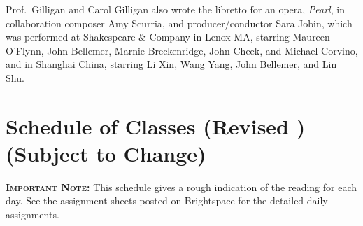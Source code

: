 \documentclass[11pt]{jgsyllabus}\usepackage[]{graphicx}\usepackage[]{xcolor}
\begin{document}
Prof.\ Gilligan and Carol Gilligan also wrote the libretto for an opera,
\emph{Pearl}, in collaboration composer Amy Scurria, and producer/conductor
Sara Jobin, which was performed at Shakespeare \& Company in Lenox MA,
starring Maureen O'Flynn, John Bellemer, Marnie Breckenridge, John Cheek, %
and Michael Corvino, and in Shanghai China,
starring Li Xin, Wang Yang, John Bellemer, and Lin Shu.
\fi
%
%
%
%
%
%

\clearpage
\appendix
\setcounter{secnumdepth}{0}
\newcommand{\maybehline}{\hline}%
\setlength\extrarowheight{4pt}
\section[Class Schedule]{Schedule of Classes
\ifrevised
	(Revised \RevisionDate)%
\else
	(Subject to Change)%
\fi}

\textbf{\scshape Important Note:} This schedule gives a rough indication of the reading for each day. See the assignment sheets posted on Brightspace for the detailed daily assignments.
\end{document}

